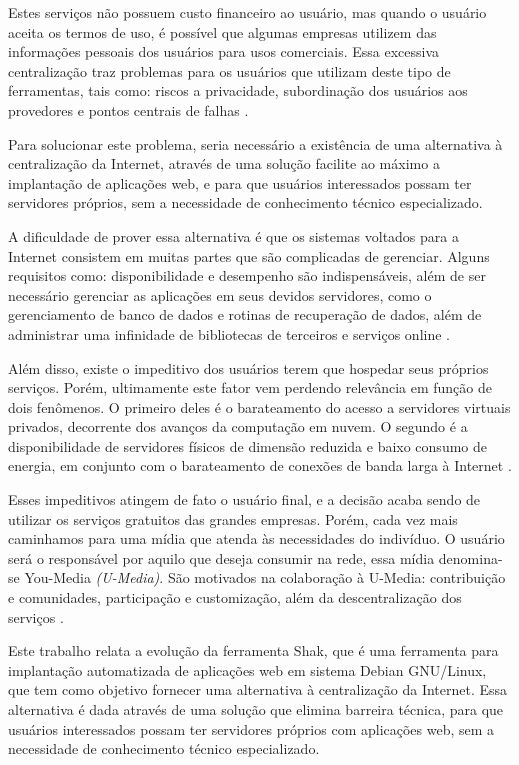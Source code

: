Estes serviços não possuem custo financeiro ao usuário, mas quando o usuário aceita os
termos de uso, é possível que algumas empresas utilizem das informações pessoais dos
usuários para usos comerciais. Essa excessiva centralização traz problemas para os usuários que utilizam deste tipo de ferramentas, tais como: riscos a privacidade, subordinação dos usuários
aos provedores e pontos centrais de falhas \cite{shak2015}. 

Para solucionar este problema, seria necessário a existência de uma alternativa à 
centralização da Internet, através de uma solução facilite ao máximo a implantação de aplicações web, e 
para que usuários interessados possam ter servidores próprios, 
sem a necessidade de conhecimento técnico especializado.

A dificuldade de prover essa alternativa é que os sistemas voltados para a
Internet consistem em muitas partes que são complicadas de gerenciar. Alguns
requisitos como: disponibilidade e desempenho são indispensáveis, além de ser
necessário gerenciar as aplicações em seus devidos servidores, como o gerenciamento de
banco de dados e rotinas de recuperação de dados, além de administrar uma
infinidade de bibliotecas de terceiros e serviços online \cite{6265084}.

Além disso, existe o impeditivo dos usuários terem que hospedar seus 
próprios serviços. Porém, ultimamente este fator vem perdendo relevância em função de
dois fenômenos. O primeiro deles é o barateamento do acesso a servidores virtuais
privados, decorrente dos avanços da computação em nuvem. O segundo é a
disponibilidade de servidores físicos de dimensão reduzida e baixo consumo de
energia, em conjunto com o barateamento de conexões de banda larga à Internet \cite{shak2015}.

Esses impeditivos atingem de fato o usuário final, e a decisão
acaba sendo de utilizar os serviços gratuitos das grandes empresas. Porém, 
cada vez mais caminhamos para uma mídia que atenda às necessidades do indivíduo. 
O usuário será o responsável por aquilo que deseja consumir na rede, essa mídia 
denomina-se You-Media \textit{(U-Media)}. São motivados na colaboração à U-Media: contribuição 
e comunidades, participação e customização, além da descentralização dos 
serviços \cite{terra2006comunicaccao}. 

Este trabalho relata a evolução da ferramenta Shak, que é uma ferramenta para implantação
automatizada de aplicações web em sistema Debian GNU/Linux, que tem como objetivo fornecer
uma alternativa à centralização da Internet. Essa alternativa é dada através de 
uma solução que elimina barreira técnica, para que usuários interessados possam 
ter servidores próprios com aplicações web, sem a necessidade de conhecimento técnico 
especializado. 

